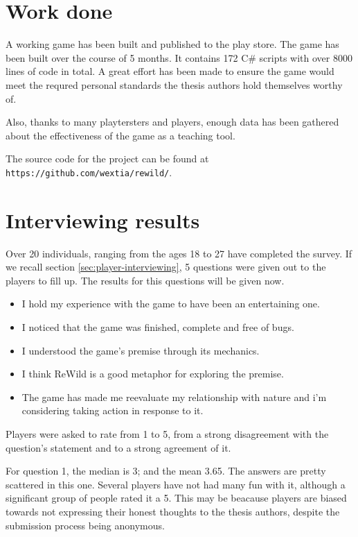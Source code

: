 \section{Work done}

A working game has been built and published to the play store.
The game has been built over the course of 5 months. It contains 172
C\# scripts with over 8000 lines of code in total. A great effort has been
made to ensure the game would meet the requred personal standards the
thesis authors hold themselves worthy of.

Also, thanks to many playtersters
and players, enough data has been gathered about the effectiveness of
the game as a teaching tool.

The source code for the project can be found at 
\texttt{https://github.com/wextia/rewild/}.

\section{Interviewing results}

Over 20 individuals, ranging from the ages 18 to 27 have completed
the survey. If we recall section \ref{sec:player-interviewing}, 5
questions were given out to the players to fill up. The
results for this questions will be given now.

\begin{itemize}
\item I hold my experience with the game to have been an entertaining one.
\item I noticed that the game was finished, complete and free of bugs.
\item I understood the game's premise through its mechanics.
\item I think ReWild is a good metaphor for exploring the premise.
\item The game has made me reevaluate my relationship with nature and i'm considering taking action in response to it.
\end{itemize}

Players were asked to rate from 1 to 5, from a strong disagreement
with the question's statement and to a strong agreement of it.

For question 1, the median is 3; and the mean 3.65. 
The answers are pretty scattered in this one. Several players have
not had many fun with it, although a significant group of people rated
it a 5. This may be beacause players are biased towards not expressing
their honest thoughts to the thesis authors, despite the submission
process being anonymous.


